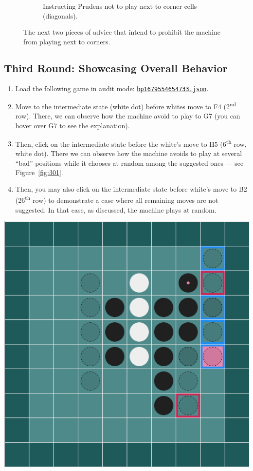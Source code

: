 \documentclass[a4paper,11pt]{article}
\theoremstyle{definition}
\theoremstyle{remark}
\numberwithin{equation}{section}
\begin{document}
\begin{figure}[!htb]
\begin{subfigure}[t]{0.48\textwidth}
			\caption{Instructing Prudens not to play next to corner cells (diagonals).}
			\label{fig:201d}
		\end{subfigure}
		\caption{The next two pieces of advice that intend to prohibit the machine from playing next to corners.}
		\label{fig:201}
	\end{figure}
	\subsection{Third Round: Showcasing Overall Behavior}\label{subsec:Third Round}
	\begin{minipage}{0.60\textwidth}
		\begin{enumerate}
			\item Load the following game in audit mode: \href{../games/hp_10_54_1679554654733.json}{\texttt{hp\textunderscore 1679554654733.json}}.
			\item Move to the intermediate state (white dot) before whites move to F4 (2\textsuperscript{nd} row). There, we can observe how the machine avoid to play to G7 (you can hover over G7 to see the explanation).
			\item Then, click on the intermediate state before the white's move to H5 (6\textsuperscript{th} row, white dot). There we can observe how the machine avoids to play at several ``bad'' positions while it chooses at random among the suggested ones --- see Figure~\ref{fig:301}.
			\item Then, you may also click on the intermediate state before white's move to B2 (26\textsuperscript{th} row) to demonstrate a case where all remaining moves are not suggested. In that case, as discussed, the machine plays at random.
		\end{enumerate}
	\end{minipage}\hfill
	\begin{minipage}{0.35\textwidth}
		\includegraphics[width = \textwidth]{../assets/coaching_success_002.png}
		\label{fig:301}
	\end{minipage}
\end{document}
